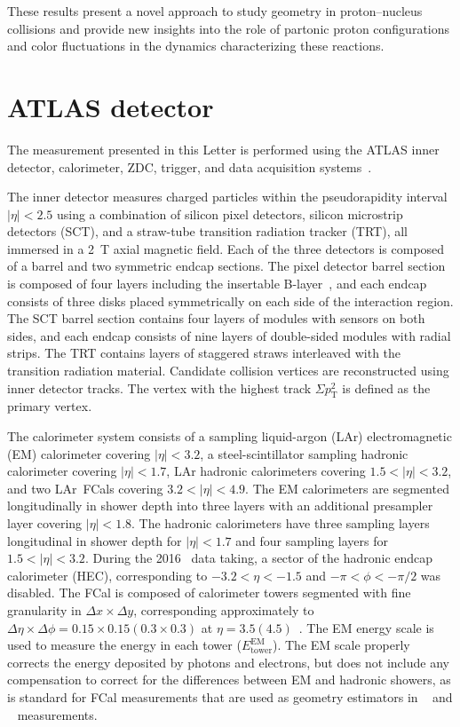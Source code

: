 \documentclass[PAPER, atlasdraft=false, USenglish, cernpreprint]{atlasdoc}
\begin{document}
These results present a novel approach to study geometry in proton--nucleus collisions and provide new insights into the role of partonic proton configurations and color fluctuations in the dynamics characterizing these reactions.
 \section{ATLAS detector}
\label{sec:detector}


The measurement presented in this Letter is performed using the ATLAS inner detector, calorimeter, ZDC, trigger, and data acquisition 
systems~\cite{PERF-2007-01}. 


The inner detector measures charged particles within the pseudorapidity interval $|\eta| < 2.5$ using a combination of silicon pixel detectors, 
silicon microstrip detectors (SCT), and a straw-tube transition radiation tracker (TRT), all immersed in a 2~T axial magnetic field. 
Each of the three detectors is composed of a barrel and two symmetric endcap sections. The pixel detector barrel section is composed of four layers including
the insertable B-layer~\cite{ATLAS-TDR-19,PIX-2018-001}, and each endcap consists of three disks placed symmetrically on each side of the interaction region. The SCT barrel section contains four layers of modules with sensors on both sides, 
and each endcap consists of nine layers of double-sided modules with radial strips. The TRT contains layers of staggered straws interleaved with
the transition radiation material.  Candidate collision vertices are reconstructed using inner detector tracks. The vertex with the highest track $\Sigma p_\mathrm{T}^2$ is defined as the primary vertex.  



The calorimeter system consists of a sampling liquid-argon (LAr) electromagnetic (EM) calorimeter covering $|\eta| < 3.2$, a steel-scintillator sampling hadronic calorimeter covering $|\eta| < 1.7$, LAr hadronic calorimeters covering $1.5 < |\eta| < 3.2$, 
and two LAr~FCals covering $3.2 < |\eta| < 4.9$. 
The EM calorimeters are segmented longitudinally in shower depth into three layers with an additional presampler layer covering $|\eta| < 1.8$.
The hadronic calorimeters have three sampling layers longitudinal in shower depth for $|\eta| < 1.7$ and four sampling layers for $1.5 < |\eta| < 3.2$.
During the 2016 \pxPb\ data taking, a sector of the hadronic endcap calorimeter (HEC), corresponding to 
$-3.2 < \eta < -1.5$ and 
$-\pi < \phi < -\pi/2$ was disabled.
The FCal is composed of calorimeter towers segmented with fine granularity in $\Delta x\times \Delta y$, corresponding approximately to $\Delta \eta \times \Delta \phi = 0.15 \times 0.15 (0.3\times 0.3)$ at $\eta = 3.5 (4.5)$~\cite{PERF-2014-07}.  
The EM energy scale is used to measure the energy in each tower ($E_\mathrm{tower}^\mathrm{EM}$).
The EM scale properly corrects the energy deposited by photons and electrons, but does not include any compensation to correct for the differences between EM and hadronic showers, as is standard for FCal measurements that are used as geometry estimators in \pxPb\ \cite{ATLAS:2014cpa, ATLAS:2023zfx, ATLAS:2022iyq} and \PbxPb\ \cite{HION-2022-14} measurements.
\end{document}
